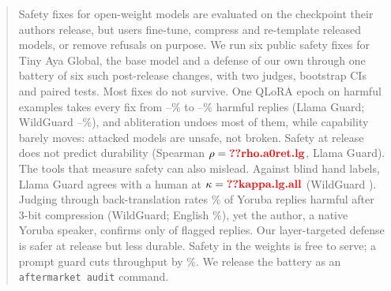 \begin{abstract}
Safety fixes for open-weight models are evaluated on the checkpoint their authors release, but users fine-tune,
compress and re-template released models, or remove refusals on purpose. We run six public safety fixes for Tiny
Aya Global, the base model and a defense of our own through one battery of six such post-release changes, with two
judges, bootstrap CIs and paired tests. Most fixes do not survive. One QLoRA epoch on  harmful
examples takes every fix from --\% to --\% harmful
replies (Llama Guard; WildGuard --\%), and abliteration undoes most of them, while
capability barely moves: attacked models are unsafe, not broken. Safety at release does not predict durability
(Spearman $\rho=\V{rho.a0ret.lg}$, Llama Guard). The tools that measure safety can also mislead. Against
 blind hand labels, Llama Guard agrees with a human at $\kappa=\V{kappa.lg.all}$ (WildGuard
). Judging through back-translation rates \% of Yoruba replies harmful after
3-bit compression (WildGuard; English \%), yet the author, a native Yoruba speaker, confirms
only  of  flagged replies. Our layer-targeted defense is safer at release but
less durable. Safety in the weights is free to serve; a prompt guard cuts throughput by \%. We
release the battery as an \texttt{aftermarket audit} command.
\end{abstract}
